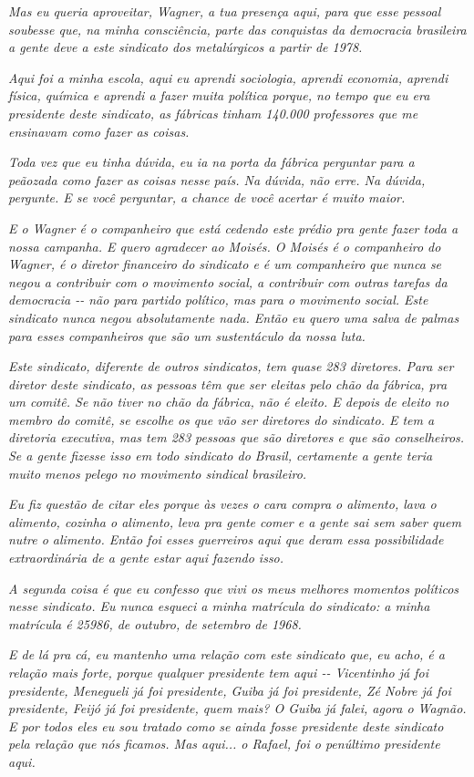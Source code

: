 \emph{Mas eu queria aproveitar, Wagner, a tua presença aqui, para que
esse pessoal soubesse que, na minha consciência, parte das conquistas da
democracia brasileira a gente deve a este sindicato dos metalúrgicos a
partir de 1978.}

\emph{Aqui foi a minha escola, aqui eu aprendi sociologia, aprendi
economia, aprendi física, química e aprendi a fazer muita política
porque, no tempo que eu era presidente deste sindicato, as fábricas
tinham 140.000 professores que me ensinavam como fazer as coisas.~}

\emph{Toda vez que eu tinha dúvida, eu ia na porta da fábrica perguntar
para a peãozada como fazer as coisas nesse país. Na dúvida, não erre. Na
dúvida, pergunte. E se você perguntar, a chance de você acertar é muito
maior.~}

\emph{E o Wagner é o companheiro que está cedendo este prédio pra gente
fazer toda a nossa campanha. E quero agradecer ao Moisés. O Moisés é o
companheiro do Wagner, é o diretor financeiro do sindicato e é um
companheiro que nunca se negou a contribuir com o movimento social, a
contribuir com outras tarefas da democracia -\/- não para partido
político, mas para o movimento social. Este sindicato nunca negou
absolutamente nada. Então eu quero uma salva de palmas para esses
companheiros que são um sustentáculo da nossa luta.~}

\emph{Este sindicato, diferente de outros sindicatos, tem quase 283
diretores. Para ser diretor deste sindicato, as pessoas têm que ser
eleitas pelo chão da fábrica, pra um comitê. Se não tiver no chão da
fábrica, não é eleito. E depois de eleito no membro do comitê, se
escolhe os que vão ser diretores do sindicato. E tem a diretoria
executiva, mas tem 283 pessoas que são diretores e que são conselheiros.
Se a gente fizesse isso em todo sindicato do Brasil, certamente a gente
teria muito menos pelego no movimento sindical brasileiro.}

\emph{Eu fiz questão de citar eles porque às vezes o cara compra o
alimento, lava o alimento, cozinha o alimento, leva pra gente comer e a
gente sai sem saber quem nutre o alimento. Então foi esses guerreiros
aqui que deram essa possibilidade extraordinária de a gente estar aqui
fazendo isso.}

\emph{A segunda coisa é que eu confesso que vivi os meus melhores
momentos políticos nesse sindicato. Eu nunca esqueci a minha matrícula
do sindicato: a minha matrícula é 25986, de outubro, de setembro de
1968.}

\emph{E de lá pra cá, eu mantenho uma relação com este sindicato que, eu
acho, é a relação mais forte, porque qualquer presidente tem aqui -\/-
Vicentinho já foi presidente, Menegueli já foi presidente, Guiba já foi
presidente, Zé Nobre já foi presidente, Feijó já foi presidente, quem
mais? O Guiba já falei, agora o Wagnão. E por todos eles eu sou tratado
como se ainda fosse presidente deste sindicato pela relação que nós
ficamos. Mas aqui... o Rafael, foi o penúltimo presidente aqui.~}

